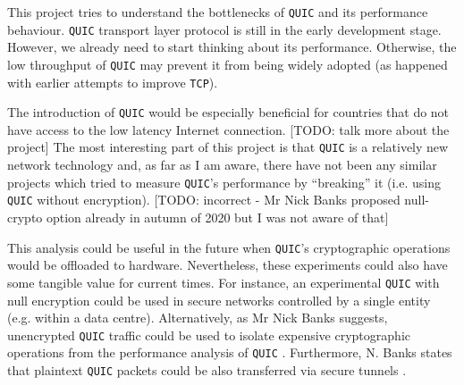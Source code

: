 \documentclass[12pt,a4paper,twoside,openright]{report}
\begin{document}
This project tries to understand the bottlenecks of \texttt{QUIC} and its performance behaviour.
\texttt{QUIC} transport layer protocol is still in the early development stage.
However, we already need to start thinking about its performance.
Otherwise, the low throughput of \texttt{QUIC} may prevent it from being widely adopted (as happened with earlier attempts to improve \texttt{TCP}). 


The introduction of \texttt{QUIC} would be especially beneficial for countries that do not have access to the low latency Internet connection.
[TODO: talk more about the project]
The most interesting part of this project is that  \texttt{QUIC} is a relatively new network technology and, as far as I am aware, there have not been any similar projects which tried to measure \texttt{QUIC}’s performance by \enquote{breaking} it (i.e. using \texttt{QUIC} without encryption).
[TODO: incorrect - Mr  Nick  Banks proposed null-crypto option already in autumn of 2020 but I was not aware of that]

This analysis could be useful in the future when \texttt{QUIC}’s cryptographic operations would be offloaded to hardware. Nevertheless, these experiments could also have some tangible value for current times. 
For instance, an experimental \texttt{QUIC} with null encryption could be used in secure networks controlled by a single entity (e.g. within a data centre).
Alternatively, as Mr Nick Banks suggests, unencrypted \texttt{QUIC} traffic could be used to isolate expensive cryptographic operations from the performance analysis of \texttt{QUIC} \cite{banks-quic-disable-encryption-00}.
Furthermore, N. Banks states that plaintext \texttt{QUIC} packets could be also transferred via secure tunnels \cite{banks-quic-disable-encryption-00}.



 
 
 
\end{document}

